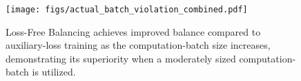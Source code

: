 \documentclass{article} %
\newcommand{\lean}[1]{\textcolor{brown}{\bf \small[#1 - wang]}}{}
\newcommand{\ours}{Loss-Free Balancing}
\newcommand{\Ours}{Loss-Free Balancing}
\begin{document}



\begin{figure}[t]
  \centering
    \texttt{[image: figs/actual\_batch\_violation\_combined.pdf]}
\caption{\Ours{} achieves improved balance compared to auxiliary-loss training as the computation-batch size increases, demonstrating its superiority when a moderately sized computation-batch is utilized.}
\label{fig:actual_batch_violation_combined.pdf}
\end{figure}

\end{document}
